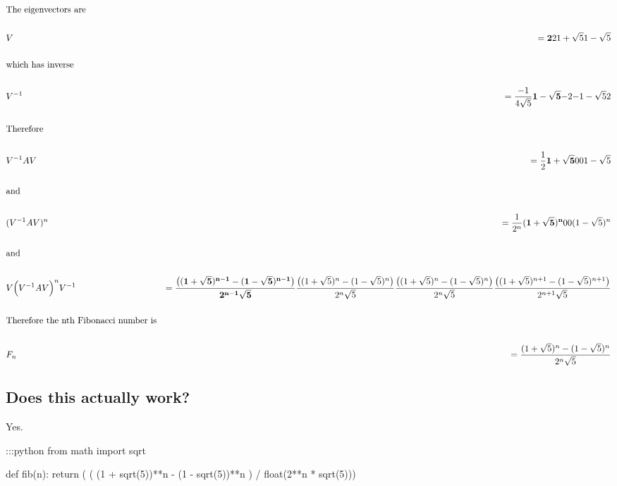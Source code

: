 \begin{align*}
&\text{The eigenvectors are}
\\\\
&V &= \mathbf{2          }{2          }
        {1 + \sqrt 5}{1 - \sqrt 5}
\\\\
&\text{which has inverse}
\\\\
&V^{-1} &= \frac{-1}{4\sqrt 5} \mathbf{1 - \sqrt 5 }{-2}
                                 {-1 - \sqrt 5}{2}
\\\\
&\text{Therefore}
\\\\
&V^{-1}AV &= \frac{1}{2} \mathbf{1 + \sqrt 5}{0          }
                            {0          }{1 - \sqrt 5}
\\\\
&\text{and}
\\\\
&(V^{-1}AV)^n &= \frac{1}{2^n} \mathbf{(1 + \sqrt 5)^n}{0          }
                                   {0                }{(1 - \sqrt 5)^n}
\\\\
&\text{and}
\\\\
&V \Big(V^{-1}AV\Big)^n V^{-1} &=
\mathbf{\frac{\big((1 + \sqrt 5)^{n-1} - (1 - \sqrt 5)^{n-1}\big)}{2^{n-1}\sqrt 5}}{\frac{\big((1 + \sqrt 5)^n     - (1 - \sqrt 5)^n    \big)}{2^n    \sqrt 5}}
    {\frac{\big((1 + \sqrt 5)^n     - (1 - \sqrt 5)^n    \big)}{2^n    \sqrt 5}}{\frac{\big((1 + \sqrt 5)^{n+1} - (1 - \sqrt 5)^{n+1}\big)}{2^{n+1}\sqrt 5}}
\\\\
&\text{Therefore the nth Fibonacci number is}
\\\\
&F_n &= \frac{(1 + \sqrt 5)^n     - (1 - \sqrt 5)^n}
             {2^n    \sqrt 5}
\end{align*}

\subsection{Does this actually work?}

Yes.

    :::python
    from math import sqrt

    def fib(n):
        return (
            ( (1 + sqrt(5))**n - (1 - sqrt(5))**n )
            /
            float(2**n * sqrt(5)))

